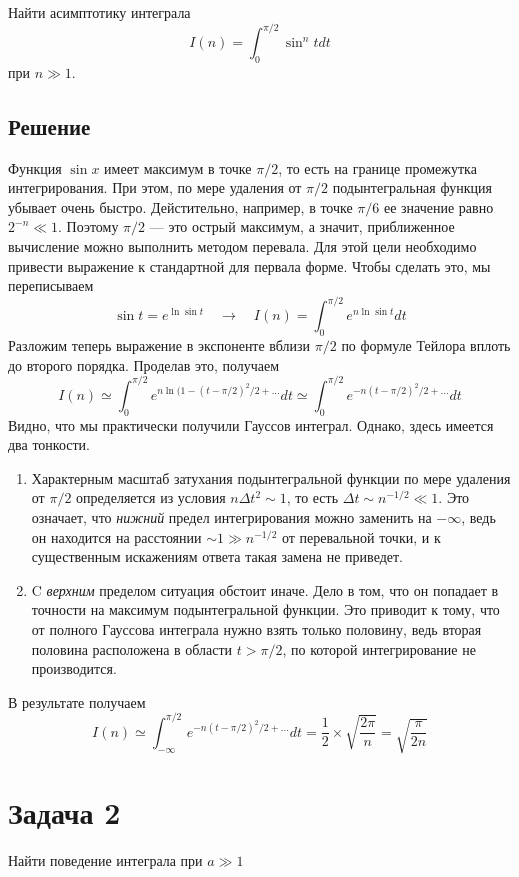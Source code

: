 \documentclass[a4paper,12pt]{article}
\begin{document}
Найти асимптотику интеграла 
\[
I(n)=\int_{0}^{\pi/2}\sin^n t dt
\]
при $n\gg 1$.


\subsection*{Решение}
Функция $\sin x$ имеет максимум в точке $\pi/2$, то есть на границе промежутка интегрирования. При этом, по мере удаления от $\pi /2$ подынтегральная функция убывает очень быстро. Дейстительно, например, в точке $\pi/6$ ее значение равно $2^{-n}\ll 1$. Поэтому $\pi/2$ --- это острый максимум, а значит, приближенное вычисление можно выполнить методом перевала. Для этой цели необходимо привести выражение к стандартной для первала форме. Чтобы сделать это, мы переписываем
\[
\sin t = e^{\ln \sin t}\quad \rightarrow \quad I(n)=\int_0^{\pi/2}e^{n\ln \sin t}dt 
\]
\noindent
Разложим теперь выражение в экспоненте вблизи $\pi/2$ по формуле Тейлора вплоть до второго порядка. Проделав это, получаем
\[
I(n)\simeq \int_0^{\pi/2}e^{n\ln (1-(t-\pi/2)^2/2+...}dt \simeq \int_0^{\pi/2}e^{-n(t-\pi/2)^2/2+...}dt
\]
\noindent
Видно, что мы практически получили Гауссов интеграл. Однако, здесь имеется два тонкости.
\begin{enumerate}
\item Характерным масштаб затухания подынтегральной функции по мере удаления от $\pi/2$ определяется из условия $n\Delta t^2\sim 1$,  то есть $\Delta t \sim n^{-1/2}\ll 1$. Это означает, что \textit{нижний} предел интегрирования можно заменить на $-\infty$, ведь он находится на расстоянии $\sim 1 \gg n^{-1/2}$ от перевальной точки, и к существенным искажениям ответа такая замена не приведет.
\item C \textit{верхним} пределом ситуация обстоит иначе. Дело в том, что он попадает в точности на максимум подынтегральной функции. Это  приводит к тому, что от полного Гауссова интеграла нужно взять только половину, ведь вторая половина расположена в области $t>\pi/2$, по которой интегрирование не производится.
\end{enumerate}
\noindent
В результате получаем
\[
I(n)\simeq \int_{-\infty}^{\pi/2}e^{-n(t-\pi/2)^2/2+...}dt=\frac{1}{2}\times \sqrt{\frac{2\pi}{n}} = \sqrt{\frac{\pi}{2n}}
\]

\section*{Задача 2}

Найти поведение интеграла при $a \gg 1$
\end{document}
